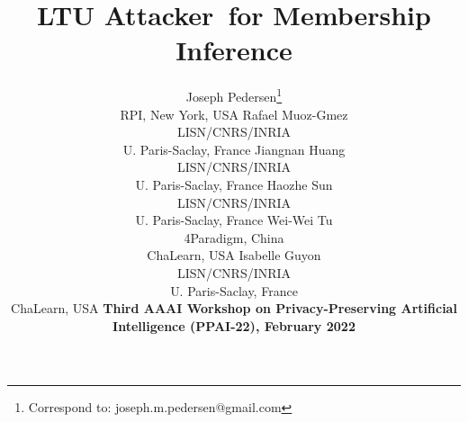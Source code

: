 \documentclass[letterpaper]{article}
\newcommand{\oracle}{LTU Attacker~}
\begin{document}
\renewcommand*{\thefootnote}{\fnsymbol{footnote}}
\title{\oracle for Membership Inference}
\author{Joseph Pedersen\thanks{Correspond to:  joseph.m.pedersen@gmail.com} \\ RPI, New York, USA
\And
Rafael Muoz-Gmez \\ LISN/CNRS/INRIA \\ U. Paris-Saclay, France
\And
Jiangnan Huang \\ LISN/CNRS/INRIA \\ U. Paris-Saclay, France
\AND
Haozhe Sun \\ LISN/CNRS/INRIA \\ U. Paris-Saclay, France
\And
Wei-Wei Tu \\ 4Paradigm, China \\ ChaLearn, USA
\And
Isabelle Guyon \\ LISN/CNRS/INRIA \\ U. Paris-Saclay, France \\ ChaLearn, USA
\AND
{\bf Third AAAI Workshop on Privacy-Preserving Artificial Intelligence (PPAI-22), February 2022}\\
}
\maketitle
\renewcommand*{\thefootnote}{\arabic{footnote}}
\setcounter{footnote}{0}
\end{document}

